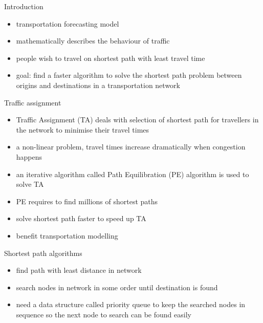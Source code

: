 \documentclass[final]{beamer}
\begin{document}
\begin{frame}{ }
    \begin{columns}[t]
        \begin{column}{.26\linewidth}

            \begin{block}{Introduction}
                \begin{itemize}
                    \itemsep.5em
                    \item transportation forecasting model
                    \item mathematically describes the behaviour of traffic
                    \item people wish to travel on shortest path with least travel time
                    \item \alert{goal}: find a \alert{faster} algorithm to solve the \alert{shortest path problem} between origins and destinations in a transportation network
                \end{itemize}
            \end{block}

            \begin{block}{Traffic assignment}
                \begin{itemize}
                    \itemsep.5em
                    \item \alert{Traffic Assignment (TA)} deals with selection of \alert{shortest path} for travellers in the network to \alert{minimise} their \alert{travel times}
                    \item a \alert{non-linear} problem, travel times increase dramatically when \alert{congestion} happens
                    \item an \alert{iterative algorithm} called \alert{Path Equilibration (PE)} algorithm is used to solve TA
                    \item \alert{PE} requires to find \alert{millions} of \alert{shortest paths}
                    \item solve shortest path faster to speed up TA 
                    \item benefit transportation modelling
                \end{itemize}
            \end{block}

            \begin{block}{Shortest path algorithms}
                \begin{itemize}
                    \itemsep.5em
                    \item find path with least distance in network
                    \item search nodes in network in some order until destination is found
                    \item need a data structure called \alert{priority queue} to keep the searched nodes in sequence so the next node to search can be found easily
                \end{itemize}
            \end{block}


\end{column}
\end{columns}
\end{frame}
\end{document}
